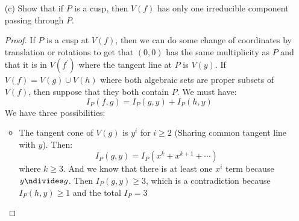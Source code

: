 \documentclass{article}
\begin{document}
\begin{itemize}
\begin{proof}
                reducing the right polynomial $f_{3} + f_{4} + \cdots$ into a polynomial in terms of just $x$, we get:
                    \begin{align*}
                        I_{P}(f, L) &= I_{P}(a_{3}x^{3} + a_{4}x^{4} + \cdots + a_{n}x^{n}, y) \\
                                    &= I_{P}(a_{3} + a_{4}x + \cdots + a_{n}x^{n - 3}, y) + I_{P}(x^{3}, y) \\
                                    &= 3I_{P}(x, y) + I_{P}(a_{3} + a_{4}x + \cdots + a_{n}x^{n - 3}, y) \\
                                    &= 3 + I_{P}(a_{3} + a_{4}x + \cdots + a_{n}x^{n - 3}, y)
                    \end{align*}
                But we know that $a_{3} \neq 0$. So $(0, 0) \notin V(a_{3} + a_{4}x + \cdots + a_{n}x^{n - 3})$. This means that the intersection multiplicity for the right summand is $0$. So we have
                    \begin{equation*}
                        I_{P}(f, L) = 3
                    \end{equation*}
                The chain of iffs means that this is a biconditional.
            \end{proof}

        \item [(c)] Show that if $P$ is a cusp, then $V(f)$ has only one irreducible component passing through $P$. 
            \begin{proof}
                If $P$ is a cusp at $V(f)$, then we can do some change of coordinates by translation or rotations to get that $(0, 0)$ has the same multiplicity as $P$ and that it is in $V(f^{\prime})$ where the tangent line at $P$ is $V(y)$. If $V(f) = V(g) \cup V(h)$ where both algebraic sets are proper subsets of $V(f)$, then suppose that they both contain $P$. We must have:
                    \begin{equation*}
                        I_{P}(f, g) = I_{P}(g, y) + I_{P}(h, y)
                    \end{equation*}
                We have three possibilities:
                    \begin{itemize}
                        \item The tangent cone of $V(g)$ is $y^{i}$ for $i \geq2$ (Sharing common tangent line with $y$). Then:
                            \begin{equation*}
                                I_{P}(g, y) = I_{P}(x^{k} + x^{k + 1} + \cdots)
                            \end{equation*}
                        where $k \geq3$. And we know that there is at least one $x^{i}$ term because $y \ndivides g$. Then $I_{P}(g, y) \geq3$, which is a contradiction because $I_{P}(h, y) \geq1$ and the total $I_{P} = 3$


\end{itemize}
\end{proof}
\end{itemize}
\end{document}
